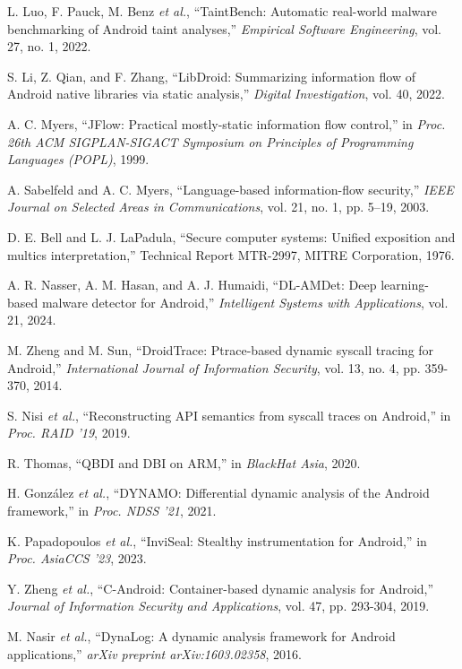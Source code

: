\documentclass[a4paper,12pt]{report}
\begin{document}
\begin{thebibliography}{99}
L. Luo, F. Pauck, M. Benz \emph{et al.}, “TaintBench: Automatic real-world malware benchmarking of Android taint analyses,” \emph{Empirical Software Engineering}, vol. 27, no. 1, 2022.

S. Li, Z. Qian, and F. Zhang, “LibDroid: Summarizing information flow of Android native libraries via static analysis,” \emph{Digital Investigation}, vol. 40, 2022.

A. C. Myers, “JFlow: Practical mostly-static information flow control,” in \emph{Proc. 26th ACM SIGPLAN-SIGACT Symposium on Principles of Programming Languages (POPL)}, 1999.

A. Sabelfeld and A. C. Myers, “Language-based information-flow security,” \emph{IEEE Journal on Selected Areas in Communications}, vol. 21, no. 1, pp. 5–19, 2003.

D. E. Bell and L. J. LaPadula, “Secure computer systems: Unified exposition and multics interpretation,” Technical Report MTR-2997, MITRE Corporation, 1976.

A. R. Nasser, A. M. Hasan, and A. J. Humaidi, “DL-AMDet: Deep learning-based malware detector for Android,” \emph{Intelligent Systems with Applications}, vol. 21, 2024.

M. Zheng and M. Sun, “DroidTrace: Ptrace-based dynamic syscall tracing for Android,” \emph{International Journal of Information Security}, vol. 13, no. 4, pp. 359-370, 2014.

S. Nisi \emph{et al.}, “Reconstructing API semantics from syscall traces on Android,” in \emph{Proc. RAID '19}, 2019.

R. Thomas, “QBDI and DBI on ARM,” in \emph{BlackHat Asia}, 2020.

H. González \emph{et al.}, “DYNAMO: Differential dynamic analysis of the Android framework,” in \emph{Proc. NDSS '21}, 2021.

K. Papadopoulos \emph{et al.}, “InviSeal: Stealthy instrumentation for Android,” in \emph{Proc. AsiaCCS '23}, 2023.

Y. Zheng \emph{et al.}, “C-Android: Container-based dynamic analysis for Android,” \emph{Journal of Information Security and Applications}, vol. 47, pp. 293-304, 2019.

M. Nasir \emph{et al.}, “DynaLog: A dynamic analysis framework for Android applications,” \emph{arXiv preprint arXiv:1603.02358}, 2016.


\end{thebibliography}
\end{document}
